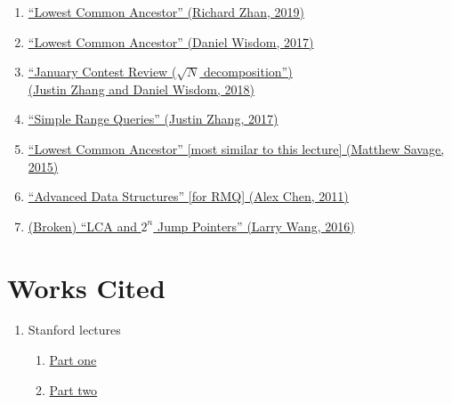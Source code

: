 \documentclass[11pt, oneside]{article}
\begin{document}
\begin{enumerate}
  \item \href{https://activities.tjhsst.edu/sct/lectures/1920/2019_10_25_LCA.pdf}{``Lowest Common Ancestor'' (Richard Zhan, 2019)}
  \item \href{https://activities.tjhsst.edu/sct/lectures/1718/2017-12-01_Lowest_Common_Ancestor.pdf}{``Lowest Common Ancestor'' (Daniel Wisdom, 2017)}
  \item \href{https://activities.tjhsst.edu/sct/lectures/1718/2018-02-09_USACO_Gold_Plat_January_Contest_Review_(square-root_decomposition).pdf}
  {``January Contest Review (\( \sqrt{N} \) decomposition'') \\ (Justin Zhang and Daniel Wisdom, 2018)}
  \item \href{https://activities.tjhsst.edu/sct/lectures/1718/2017-10-06_Simple_Range_Queries.pdf}{``Simple Range Queries'' (Justin Zhang, 2017)}
  \item \href{https://activities.tjhsst.edu/sct/lectures/1415/SCT_Lowest_Common_Ancestor.pdf}{``Lowest Common Ancestor'' [most similar to this lecture] (Matthew Savage, 2015)}
  \item \href{https://activities.tjhsst.edu/sct/lectures/1112/rquery102811.pdf}{``Advanced Data Structures'' [for RMQ] (Alex Chen, 2011)}
  \item \href{https://activities.tjhsst.edu/sct/lectures/1617/2016-10-21_LCA_and_2_n_Jump_Pointers.pdf}{(Broken) ``LCA and \( 2^n \) Jump Pointers'' (Larry Wang, 2016)}
\end{enumerate}

\section{Works Cited}

\begin{enumerate}
  \item Stanford lectures
    \begin{enumerate}
      \item \href{http://web.stanford.edu/class/cs166/lectures/00/Slides00.pdf}{Part one}
      \item \href{http://web.stanford.edu/class/cs166/lectures/01/Slides01.pdf}{Part two}
    \end{enumerate}
\end{enumerate}
\end{document}
